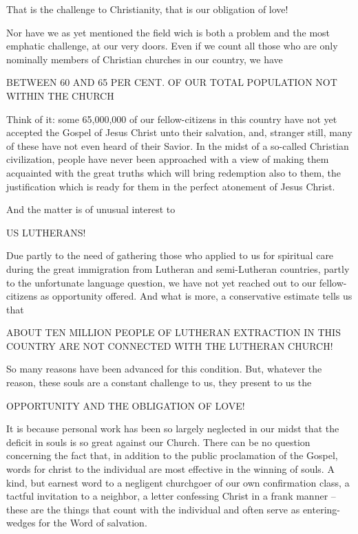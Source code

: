\documentclass[
]{book}
\begin{document}
That is the challenge to Christianity, that is our obligation of love!

Nor have we as yet mentioned the field wich is both a problem and the most emphatic challenge, at our very doors. Even if we count all those who are only nominally members of Christian churches in our country, we have

\begin{center} BETWEEN 60 AND 65 PER CENT. OF OUR TOTAL POPULATION NOT WITHIN THE CHURCH \end{center}

Think of it: some 65,000,000 of our fellow-citizens in this country have not yet accepted the Gospel of Jesus Christ unto their salvation, and, stranger still, many of these have not even heard of their Savior. In the midst of a so-called Christian civilization, people have never been approached with a view of making them acquainted with the great truths which will bring redemption also to them, the justification which is ready for them in the perfect atonement of Jesus Christ.

And the matter is of unusual interest to

\begin{center} US LUTHERANS! \end{center}

Due partly to the need of gathering those who applied to us for spiritual care during the great immigration from Lutheran and semi-Lutheran countries, partly to the unfortunate language question, we have not yet reached out to our fellow-citizens as opportunity offered. And what is more, a conservative estimate tells us that

\begin{center} ABOUT TEN MILLION PEOPLE OF LUTHERAN EXTRACTION IN THIS COUNTRY ARE NOT CONNECTED WITH THE LUTHERAN CHURCH! \end{center}

So many reasons have been advanced for this condition. But, whatever the reason, these souls are a constant challenge to us, they present to us the

\begin{center} OPPORTUNITY AND THE OBLIGATION OF LOVE! \end{center}

It is because personal work has been so largely neglected in our midst that the deficit in souls is so great against our Church. There can be no question concerning the fact that, in addition to the public proclamation of the Gospel, words for christ to the individual are most effective in the winning of souls. A kind, but earnest word to a negligent churchgoer of our own confirmation class, a tactful invitation to a neighbor, a letter confessing Christ in a frank manner -- these are the things that count with the individual and often serve as entering-wedges for the Word of salvation.
\end{document}
